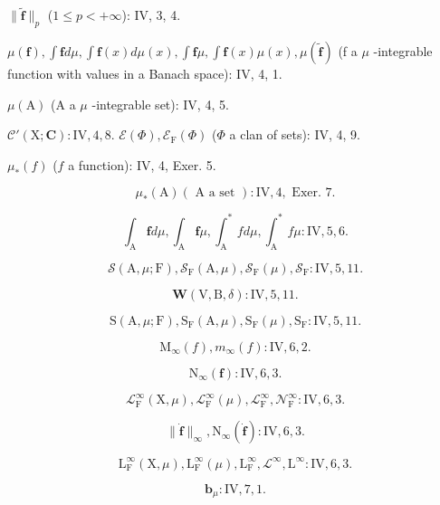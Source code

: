 \(\| \widetilde{\mathbf{f}} \| _p\) (\(1\leqslant p < + \infty\)): IV, 3, 4.

\(\mu (\mathbf{f}),\int \mathbf{f}d\mu ,\int \mathbf{f}(x)d\mu (x),\int \mathbf{f}\mu ,\int \mathbf{f}(x)\mu (x),\mu (\widetilde{\mathbf{f}})\) (f a \(\mu\) -integrable function with values in a Banach space): IV, 4, 1.

\(\mu (\mathrm{A})\) (A a \(\mu\) -integrable set): IV, 4, 5.

\(\mathcal{C}'(\mathrm{X};\mathbf{C}):\mathrm{IV},4,8.\) \(\mathcal{E}(\Phi),\mathcal{E}_{\mathrm{F}}(\Phi)\) (\(\Phi\) a clan of sets): IV, 4, 9.

\(\mu_{*}(f)\) (\(f\) a function): IV, 4, Exer. 5.

\[
\mu_ {*} (\mathrm{A}) (\text { A a set }): \mathrm{IV}, 4, \text { Exer. } 7.
\]

\[
\int_ {\mathrm{A}} \textbf {f} d \mu , \int_ {\mathrm{A}} \textbf {f} \mu , \int_ {\mathrm{A}} ^ {*} f d \mu , \int_ {\mathrm{A}} ^ {*} f \mu : \mathrm{IV}, 5, 6.
\]

\[
\mathcal {S} (\mathrm{A}, \mu ; \mathrm{F}), \mathcal {S} _ {\mathrm{F}} (\mathrm{A}, \mu), \mathcal {S} _ {\mathrm{F}} (\mu), \mathcal {S} _ {\mathrm{F}}: \mathrm{IV}, 5, 11.
\]

\[
\boldsymbol {W} (\mathrm{V}, \mathrm{B}, \delta): \mathrm{IV}, 5, 11.
\]

\[
\mathrm{S} (\mathrm{A}, \mu ; \mathrm{F}), \mathrm{S} _ {\mathrm{F}} (\mathrm{A}, \mu), \mathrm{S} _ {\mathrm{F}} (\mu), \mathrm{S} _ {\mathrm{F}}: \mathrm{IV}, 5, 11.
\]

\[
\mathrm{M} _ {\infty} (f), m _ {\infty} (f): \mathrm{IV}, 6, 2.
\]

\[
\mathrm{N} _ {\infty} (\mathbf {f}): \mathrm{IV}, 6, 3.
\]

\[
\mathcal {L} _ {\mathrm{F}} ^ {\infty} (\mathrm{X}, \mu), \mathcal {L} _ {\mathrm{F}} ^ {\infty} (\mu), \mathcal {L} _ {\mathrm{F}} ^ {\infty}, \mathcal {N} _ {\mathrm{F}} ^ {\infty}: \mathrm{IV}, 6, 3.
\]

\[
\| \dot {\mathbf {f}} \| _ {\infty}, \mathrm{N} _ {\infty} (\dot {\mathbf {f}}): \mathrm{IV}, 6, 3.
\]

\[
\mathrm{L} _ {\mathrm{F}} ^ {\infty} (\mathrm{X}, \mu), \mathrm{L} _ {\mathrm{F}} ^ {\infty} (\mu), \mathrm{L} _ {\mathrm{F}} ^ {\infty}, \mathcal {L} ^ {\infty}, \mathrm{L} ^ {\infty}: \mathrm{IV}, 6, 3.
\]

\[
\mathbf {b} _ {\mu}: \mathrm{IV}, 7, 1.
\]

